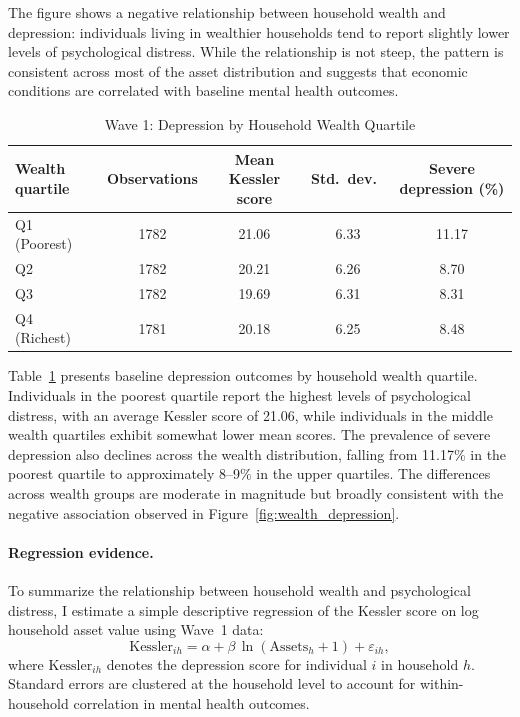 \documentclass[12pt]{article}
\begin{document}
The figure shows a negative relationship between household wealth and depression: individuals living in wealthier households tend to report slightly lower levels of psychological distress. While the relationship is not steep, the pattern is consistent across most of the asset distribution and suggests that economic conditions are correlated with baseline mental health outcomes.

\begin{table}[H]
\centering
\caption{Wave 1: Depression by Household Wealth Quartile}
\label{tab:wealth_quartile}
\begin{tabular}{lcccc}
\toprule
Wealth quartile & Observations & Mean Kessler score & Std.\ dev.\ & Severe depression (\%) \\
\midrule
Q1 (Poorest) & 1782 & 21.06 & 6.33 & 11.17 \\
Q2           & 1782 & 20.21 & 6.26 &  8.70 \\
Q3           & 1782 & 19.69 & 6.31 &  8.31 \\
Q4 (Richest) & 1781 & 20.18 & 6.25 &  8.48 \\
\bottomrule
\end{tabular}
\end{table}

Table~\ref{tab:wealth_quartile} presents baseline depression outcomes by household wealth quartile. Individuals in the poorest quartile report the highest levels of psychological distress, with an average Kessler score of 21.06, while individuals in the middle wealth quartiles exhibit somewhat lower mean scores. The prevalence of severe depression also declines across the wealth distribution, falling from 11.17\% in the poorest quartile to approximately 8--9\% in the upper quartiles. The differences across wealth groups are moderate in magnitude but broadly consistent with the negative association observed in Figure~\ref{fig:wealth_depression}.

\paragraph{Regression evidence.} To summarize the relationship between household wealth and psychological distress, I estimate a simple descriptive regression of the Kessler score on log household asset value using Wave~1 data:
\begin{equation}
\text{Kessler}_{ih} = \alpha + \beta \, \ln(\text{Assets}_h + 1) + \varepsilon_{ih},
\label{eq:wealth_reg}
\end{equation}
where $\text{Kessler}_{ih}$ denotes the depression score for individual $i$ in household $h$. Standard errors are clustered at the household level to account for within-household correlation in mental health outcomes.
\end{document}
